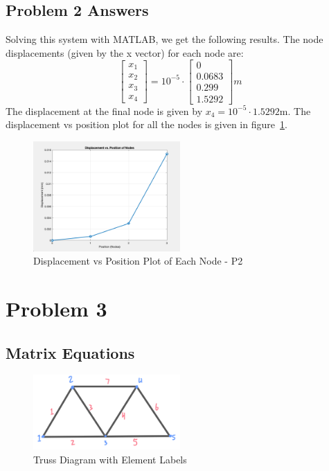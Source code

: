 \documentclass[8pt]{article}
\begin{document}
\subsection{Problem 2 Answers}
Solving this system with MATLAB, we get the following results. The node displacements (given by the x vector) for each node are:
\[
\begin{bmatrix}
    x_1 \\
    x_2 \\
    x_3 \\
    x_4 
\end{bmatrix}
=
10^{-5} \cdot
\begin{bmatrix}
    0 \\
    0.0683 \\
    0.299 \\
    1.5292 
\end{bmatrix}
m
\]
The displacement at the final node is given by \(x_4 = 10^{-5}\cdot1.5292\)m.
The displacement vs position plot for all the nodes is given in figure~\ref{fig:P2_out}.
\begin{figure}[h!]
    \centering
    \includegraphics[width=0.5\textwidth]{../../assets/Q2_Graph}
    \caption{Displacement vs Position Plot of Each Node - P2}
    \label{fig:P2_out}
\end{figure}



\section{Problem 3}

\subsection{Matrix Equations}

\begin{figure}[!h]
    \centering
    \includegraphics[width=0.5\textwidth]{../../assets/Truss_Labels.png}
    \caption{Truss Diagram with Element Labels}
    \label{fig:P2_Truss_Lables}
\end{figure}
\end{document}
